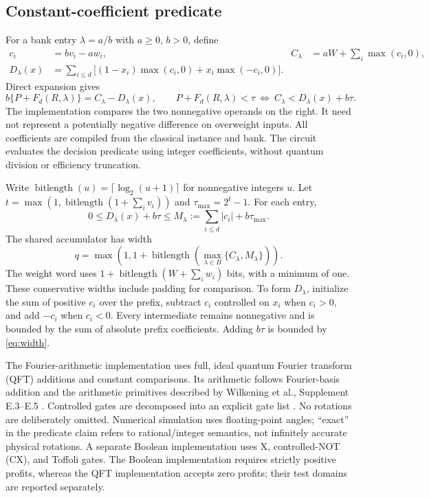 \documentclass[referee,pdflatex,sn-mathphys-num]{sn-jnl}
\theoremstyle{thmstyleone}
\theoremstyle{thmstyletwo}
\begin{document}
\subsection{Constant-coefficient predicate}
For a bank entry $\lambda=a/b$ with $a\geq0$, $b>0$, define
\begin{align}
 c_i&=bv_i-aw_i,& C_\lambda&=aW+\sum_i\max(c_i,0),\\
 D_\lambda(x)&=\sum_{i\leq d}\bigl[(1-x_i)\max(c_i,0)+x_i\max(-c_i,0)\bigr].\label{eq:loss}
\end{align}
Direct expansion gives
\begin{equation}\label{eq:integercompare}
 b\{P+F_d(R,\lambda)\}=C_\lambda-D_\lambda(x),\qquad
 P+F_d(R,\lambda)<\tau\ \Longleftrightarrow\ C_\lambda<D_\lambda(x)+b\tau.
\end{equation}
The implementation compares the two nonnegative operands on the right. It need not represent a potentially negative difference on overweight inputs. All coefficients are compiled from the classical instance and bank. The circuit evaluates the decision predicate using integer coefficients, without quantum division or efficiency truncation.

Write $\operatorname{bitlength}(u)=\lceil\log_2(u+1)\rceil$ for nonnegative integers $u$. Let $t=\max(1,\operatorname{bitlength}(1+\sum_i v_i))$ and $\tau_{\max}=2^t-1$. For each entry,
\begin{equation}\label{eq:width}
 0\leq D_\lambda(x)+b\tau\leq M_\lambda:=\sum_{i\leq d}|c_i|+b\tau_{\max}.
\end{equation}
The shared accumulator has width
\begin{equation}
 q=\max\left(1,1+\operatorname{bitlength}\left(\max_{\lambda\in B}\{C_\lambda,M_\lambda\}\right)\right).
\end{equation}
The weight word uses $1+\operatorname{bitlength}(W+\sum_iw_i)$ bits, with a minimum of one. These conservative widths include padding for comparison. To form $D_\lambda$, initialize the sum of positive $c_i$ over the prefix, subtract $c_i$ controlled on $x_i$ when $c_i>0$, and add $-c_i$ when $c_i<0$. Every intermediate remains nonnegative and is bounded by the sum of absolute prefix coefficients. Adding $b\tau$ is bounded by \eqref{eq:width}.

The Fourier-arithmetic implementation uses full, ideal quantum Fourier transform (QFT) additions and constant comparisons. Its arithmetic follows Fourier-basis addition \cite{draper2000} and the arithmetic primitives described by Wilkening et al., Supplement E.3--E.5 \cite{wilkening2025}. Controlled gates are decomposed into an explicit gate list \cite{barenco1995}. No rotations are deliberately omitted. Numerical simulation uses floating-point angles; ``exact'' in the predicate claim refers to rational/integer semantics, not infinitely accurate physical rotations. A separate Boolean implementation uses X, controlled-NOT (CX), and Toffoli gates. The Boolean implementation requires strictly positive profits, whereas the QFT implementation accepts zero profits; their test domains are reported separately.
\end{document}
